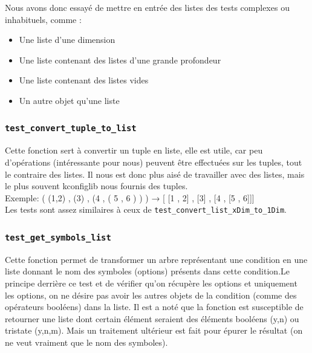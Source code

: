 \documentclass[16pts]{report}
\begin{document}
Nous avons donc essayé de mettre en entrée des listes des tests complexes ou 
inhabituels, comme : \\

\begin{itemize}
    \item Une liste d’une dimension
    \item Une liste contenant des listes d'une grande profondeur
    \item Une liste contenant des listes vides
    \item Un autre objet qu'une liste
\end{itemize}

\subsubsection{\texttt{test\_convert\_tuple\_to\_list}}

Cette fonction sert à convertir un tuple en liste, elle est utile, car peu
d'opérations (intéressante pour nous) peuvent être effectuées sur les tuples, tout le contraire des 
listes. Il nous est donc plus aisé de travailler avec des listes, mais le 
plus souvent kconfiglib nous fournis des tuples. \\

Exemple: ( (1,2) , (3) , (4 , ( 5 , 6 ) ) ) → [ [1 , 2] , [3] , [4 , [5 , 6]]] 
\\

Les tests sont assez similaires à ceux de \verb|test_convert_list_xDim_to_1Dim|. \\


\subsubsection{\texttt{test\_get\_symbols\_list}}

Cette fonction permet de transformer un arbre représentant une condition
en une liste donnant le nom des symboles (options) présents dans cette 
condition.Le principe derrière ce test et de vérifier qu'on récupère les 
options et uniquement les options, on ne désire pas avoir les autres objets 
de la condition (comme des opérateurs booléens) dans la liste.
Il est a noté que la fonction est susceptible de retourner une liste dont 
certain élément seraient des éléments booléens (y,n) ou tristate (y,n,m). 
Mais un traitement ultérieur est fait pour épurer le résultat (on ne 
veut vraiment que le nom des symboles).
\\
\end{document}
